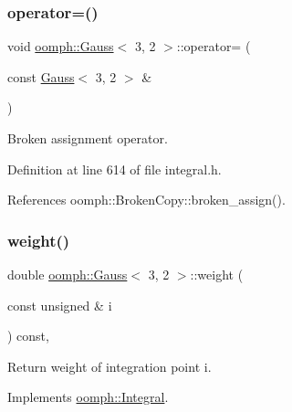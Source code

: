 \mbox{\label{classoomph_1_1Gauss_3_013_00_012_01_4_ac71cb9c496aeaec5d18f486e171a6d92}} 
\subsubsection{\texorpdfstring{operator=()}{operator=()}}
{\footnotesize\ttfamily void \hyperlink{classoomph_1_1Gauss}{oomph\+::\+Gauss}$<$ 3, 2 $>$\+::operator= (\begin{DoxyParamCaption}\item[{const \hyperlink{classoomph_1_1Gauss}{Gauss}$<$ 3, 2 $>$ \&}]{ }\end{DoxyParamCaption})\hspace{0.3cm}{\ttfamily [inline]}}



Broken assignment operator. 



Definition at line 614 of file integral.\+h.



References oomph\+::\+Broken\+Copy\+::broken\+\_\+assign().

\mbox{\label{classoomph_1_1Gauss_3_013_00_012_01_4_afd229e2878bc94ec046cf9293e7acb87}} 
\subsubsection{\texorpdfstring{weight()}{weight()}}
{\footnotesize\ttfamily double \hyperlink{classoomph_1_1Gauss}{oomph\+::\+Gauss}$<$ 3, 2 $>$\+::weight (\begin{DoxyParamCaption}\item[{const unsigned \&}]{i }\end{DoxyParamCaption}) const\hspace{0.3cm}{\ttfamily [inline]}, {\ttfamily [virtual]}}



Return weight of integration point i. 



Implements \hyperlink{classoomph_1_1Integral_ac65335e2aab120b285b3d6c294507b06}{oomph\+::\+Integral}.



